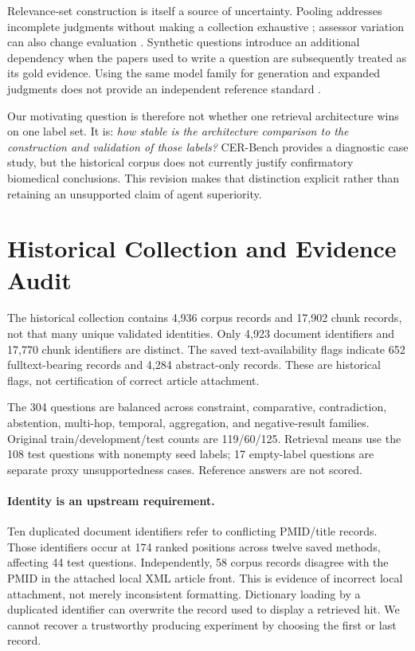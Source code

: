 \documentclass{article}
\begin{document}
Relevance-set construction is itself a source of uncertainty. Pooling addresses
incomplete judgments without making a collection exhaustive
\citep{buckley2004incomplete}; assessor variation can also change evaluation
\citep{voorhees2000judgments}. Synthetic questions introduce an additional
dependency when the papers used to write a question are subsequently treated as
its gold evidence. Using the same model family for generation and expanded
judgments does not provide an independent reference standard
\citep{zheng2023judge}.

Our motivating question is therefore not whether one retrieval architecture wins
on one label set. It is: \emph{how stable is the architecture comparison to the
construction and validation of those labels?} CER-Bench provides a diagnostic
case study, but the historical corpus does not currently justify confirmatory
biomedical conclusions. This revision makes that distinction explicit rather
than retaining an unsupported claim of agent superiority.

\section{Historical Collection and Evidence Audit}
The historical collection contains 4,936 corpus records and 17,902 chunk records,
not that many unique validated identities. Only 4,923 document identifiers and
17,770 chunk identifiers are distinct. The saved text-availability flags indicate
652 fulltext-bearing records and 4,284 abstract-only records. These are historical
flags, not certification of correct article attachment.

The 304 questions are balanced across constraint, comparative, contradiction,
abstention, multi-hop, temporal, aggregation, and negative-result families.
Original train/development/test counts are 119/60/125. Retrieval means use the
108 test questions with nonempty seed labels; 17 empty-label questions are
separate proxy unsupportedness cases. Reference answers are not scored.

\paragraph{Identity is an upstream requirement.}
Ten duplicated document identifiers refer to conflicting PMID/title records.
Those identifiers occur at 174 ranked positions across twelve saved methods,
affecting 44 test questions. Independently, 58 corpus records disagree with the
PMID in the attached local XML article front. This is evidence of incorrect local
attachment, not merely inconsistent formatting. Dictionary loading by a duplicated
identifier can overwrite the record used to display a retrieved hit. We cannot
recover a trustworthy producing experiment by choosing the first or last record.
\end{document}

